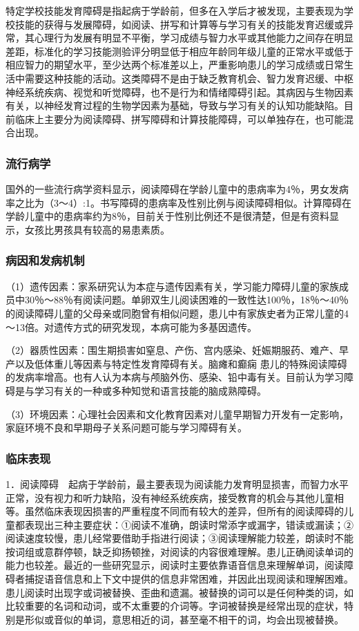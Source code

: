 特定学校技能发育障碍是指起病于学龄前，但多在入学后才被发现，主要表现为学校技能的获得与发展障碍，如阅读、拼写和计算等与学习有关的技能发育迟缓或异常，其心理行为发展有明显不平衡，学习成绩与智力水平或其他能力之间存在明显差距，标准化的学习技能测验评分明显低于相应年龄同年级儿童的正常水平或低于相应智力的期望水平，至少达两个标准差以上，严重影响患儿的学习成绩或日常生活中需要这种技能的活动。这类障碍不是由于缺乏教育机会、智力发育迟缓、中枢神经系统疾病、视觉和听觉障碍，也不是行为和情绪障碍引起。其病因与生物因素有关，以神经发育过程的生物学因素为基础，导致与学习有关的认知功能缺陷。目前临床上主要分为阅读障碍、拼写障碍和计算技能障碍，可以单独存在，也可能混合出现。

\subsubsection{流行病学}

国外的一些流行病学资料显示，阅读障碍在学龄儿童中的患病率为4％，男女发病率之比为（3～4）:1。书写障碍的患病率及性别比例与阅读障碍相似。计算障碍在学龄儿童中的患病率约为8％，目前关于性别比例还不是很清楚，但是有资料显示，女孩比男孩具有较高的易患素质。

\subsubsection{病因和发病机制}

（1）遗传因素：家系研究认为本症与遗传因素有关，学习能力障碍儿童的家族成员中30％～88％有阅读问题。单卵双生儿阅读困难的一致性达100％，18％～40％的阅读障碍儿童的父母亲或同胞曾有相似问题，患儿中有家族史者为正常儿童的4～13倍。对遗传方式的研究发现，本病可能为多基因遗传。

（2）器质性因素：围生期损害如窒息、产伤、宫内感染、妊娠期服药、难产、早产以及低体重儿等因素与特定性发育障碍有关。脑瘫和癫痫
患儿的特殊阅读障碍的发病率增高。也有人认为本病与颅脑外伤、感染、铅中毒有关。目前认为学习障碍是与学习有关的一种或多种知觉和语言技能的脑成熟障碍。

（3）环境因素：心理社会因素和文化教育因素对儿童早期智力开发有一定影响，家庭环境不良和早期母子关系问题可能与学习障碍有关。

\subsubsection{临床表现}

1．阅读障碍　起病于学龄前，最主要表现为阅读能力发育明显损害，而智力水平正常，没有视力和听力缺陷，没有神经系统疾病，接受教育的机会与其他儿童相等。虽然临床表现因损害的严重程度不同而有较大的差异，但所有的阅读障碍的儿童都表现出三种主要症状：①阅读不准确，朗读时常添字或漏字，错读或漏读；②阅读速度较慢，患儿经常要借助手指进行阅读；③阅读理解能力较差，朗读时不能按词组或意群停顿，缺乏抑扬顿挫，对阅读的内容很难理解。患儿正确阅读单词的能力也较差。最近的一些研究显示，阅读时主要依靠语音信息来理解单词，阅读障碍者捕捉语音信息和上下文中提供的信息非常困难，并因此出现阅读和理解困难。患儿阅读时出现字或词被替换、歪曲和遗漏。被替换的词可以是任何种类的词，如比较重要的名词和动词，或不太重要的介词等。字词被替换是经常出现的症状，特别是形似或音似的单词，意思相近的词，甚至毫不相干的词，均会出现被替换。

